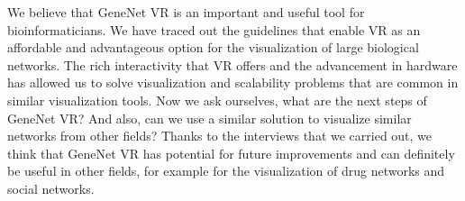 We believe that GeneNet VR is an important and useful tool for bioinformaticians. We have traced out the guidelines that enable VR as an affordable and advantageous option for the visualization of large biological networks. The rich interactivity that VR offers and the advancement in hardware has allowed us to solve visualization and scalability problems that are common in similar visualization tools. Now we ask ourselves, what are the next steps of GeneNet VR? And also, can we use a similar solution to visualize similar networks from other fields? Thanks to the interviews that we carried out, we think that GeneNet VR has potential for future improvements and can definitely be useful in other fields, for example for the visualization of drug networks and social networks.
